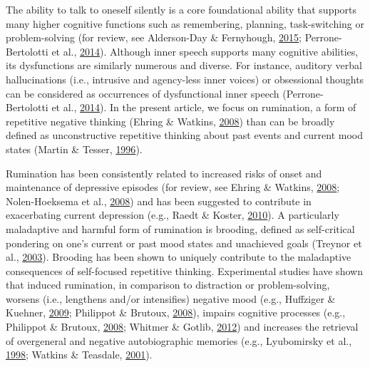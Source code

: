 \documentclass[a4paper,12pt,twoside,openright,oldfontcommands,final]{memoir}
\begin{document}
The ability to talk to oneself silently is a core foundational ability that supports many higher cognitive functions such as remembering, planning, task-switching or problem-solving (for review, see Alderson-Day \& Fernyhough, \protect\hyperlink{ref-alderson-day_inner_2015}{2015}; Perrone-Bertolotti et al., \protect\hyperlink{ref-Perrone-Bertolotti2014}{2014}). Although inner speech supports many cognitive abilities, its dysfunctions are similarly numerous and diverse. For instance, auditory verbal hallucinations (i.e., intrusive and agency-less inner voices) or obsessional thoughts can be considered as occurrences of dysfunctional inner speech (Perrone-Bertolotti et al., \protect\hyperlink{ref-Perrone-Bertolotti2014}{2014}). In the present article, we focus on rumination, a form of repetitive negative thinking (Ehring \& Watkins, \protect\hyperlink{ref-ehring_repetitive_2008}{2008}) than can be broadly defined as unconstructive repetitive thinking about past events and current mood states (Martin \& Tesser, \protect\hyperlink{ref-Martin}{1996}).

Rumination has been consistently related to increased risks of onset and maintenance of depressive episodes (for review, see Ehring \& Watkins, \protect\hyperlink{ref-ehring_repetitive_2008}{2008}; Nolen-Hoeksema et al., \protect\hyperlink{ref-Nolen-Hoeksema2008}{2008}) and has been suggested to contribute in exacerbating current depression (e.g., Raedt \& Koster, \protect\hyperlink{ref-Raedt2010}{2010}). A particularly maladaptive and harmful form of rumination is brooding, defined as self-critical pondering on one's current or past mood states and unachieved goals (Treynor et al., \protect\hyperlink{ref-treynor_rumination_2003}{2003}). Brooding has been shown to uniquely contribute to the maladaptive consequences of self-focused repetitive thinking. Experimental studies have shown that induced rumination, in comparison to distraction or problem-solving, worsens (i.e., lengthens and/or intensifies) negative mood (e.g., Huffziger \& Kuehner, \protect\hyperlink{ref-Huffziger2009}{2009}; Philippot \& Brutoux, \protect\hyperlink{ref-Philippot2008}{2008}), impairs cognitive processes (e.g., Philippot \& Brutoux, \protect\hyperlink{ref-Philippot2008}{2008}; Whitmer \& Gotlib, \protect\hyperlink{ref-whitmer_switching_2012}{2012}) and increases the retrieval of overgeneral and negative autobiographic memories (e.g., Lyubomirsky et al., \protect\hyperlink{ref-Lyubomirsky1998}{1998}; Watkins \& Teasdale, \protect\hyperlink{ref-watkins_rumination_2001}{2001}).
\end{document}
